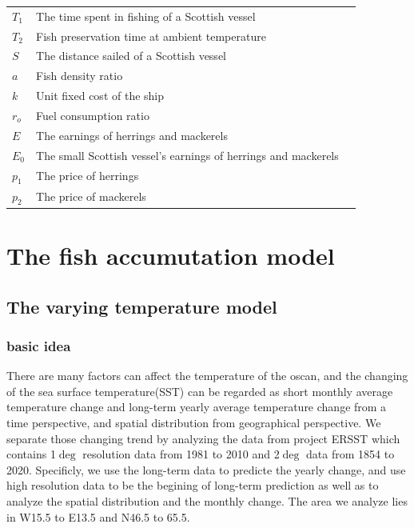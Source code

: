 \documentclass{mcmthesis}
\begin{document}
\begin{center}
\begin{longtable}{p{}p{}m{}}
$T_1$     & The time spent in fishing of a Scottish vessel   
                                                        \\
$T_2$       & Fish preservation time at ambient temperature        \\

$S$      & The distance sailed of a Scottish vessel   \\
$a$      & Fish density ratio \\
$k$      & Unit fixed cost of the ship  \\
$r_o$      & Fuel consumption ratio \\
$E$      & The earnings  of herrings and mackerels \\
$E_0$      & The small Scottish vessel's earnings  of herrings and mackerels \\
$p_1$      & The price  of herrings \\
$p_2$      & The price  of mackerels  \\






 \end{longtable}
 \end{center}

 \section{The fish accumutation model}
 \subsection{The varying temperature model}
 \cite{long2014fast}
 \subsubsection{basic idea}
    There are many factors can affect the temperature of the oscan, and the changing of the sea surface temperature(SST) can be 
    regarded as short monthly average temperature change and long-term yearly average temperature change from a time perspective, and spatial distribution from geographical perspective. We separate those changing trend by analyzing the data from project ERSST which contains 1$\deg$ resolution data from 1981 to 2010 and 2$\deg$ data from 1854 to 2020. Specificly, we use the long-term data to predicte the yearly change, and use high resolution data to be the begining of long-term prediction as well as to analyze the spatial distribution and the monthly change. The area we analyze lies in W15.5 to E13.5 and N46.5 to 65.5.
\end{document}
